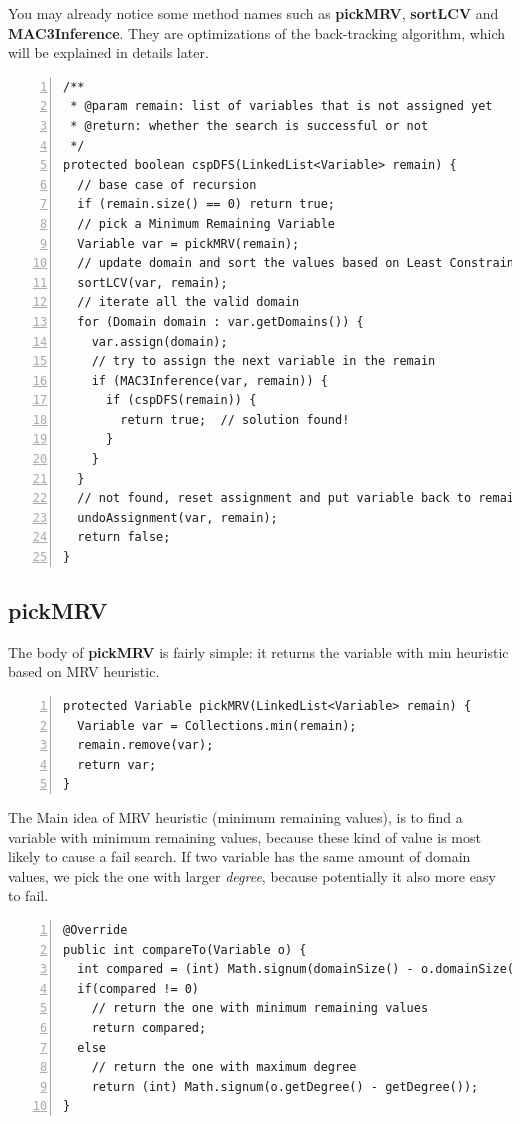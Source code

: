 \documentclass{article}
\begin{document}
You may already notice some method names such as \textbf{pickMRV}, \textbf{sortLCV} and \textbf{MAC3Inference}. They are optimizations of the back-tracking algorithm, which will be explained in details later.

\begin{lstlisting}[numbers=left, caption=CSPsolver.class]
/**
 * @param remain: list of variables that is not assigned yet
 * @return: whether the search is successful or not
 */
protected boolean cspDFS(LinkedList<Variable> remain) {
  // base case of recursion
  if (remain.size() == 0) return true;
  // pick a Minimum Remaining Variable
  Variable var = pickMRV(remain);
  // update domain and sort the values based on Least Constraining
  sortLCV(var, remain);
  // iterate all the valid domain
  for (Domain domain : var.getDomains()) {
    var.assign(domain);
    // try to assign the next variable in the remain
    if (MAC3Inference(var, remain)) {
      if (cspDFS(remain)) {
        return true;  // solution found!
      }
    }
  }
  // not found, reset assignment and put variable back to remain
  undoAssignment(var, remain);
  return false;
}
\end{lstlisting}





\clearpage
\subsection{pickMRV}

The body of \textbf{pickMRV} is fairly simple: it returns the variable with min heuristic based on MRV heuristic.

\begin{lstlisting}[numbers=left, caption=CSPsolver.class]   
protected Variable pickMRV(LinkedList<Variable> remain) {
  Variable var = Collections.min(remain);
  remain.remove(var);
  return var;
}
\end{lstlisting}

The Main idea of MRV heuristic (minimum remaining values), is to find a variable with minimum remaining values, because these kind of value is most likely to cause a fail search. If two variable has the same amount of domain values, we pick the one with larger \emph{degree}, because potentially it also more easy to fail.

\begin{lstlisting}[numbers=left, caption=CSPsolver.class]    
@Override
public int compareTo(Variable o) {
  int compared = (int) Math.signum(domainSize() - o.domainSize());
  if(compared != 0)
    // return the one with minimum remaining values
    return compared;
  else
    // return the one with maximum degree
    return (int) Math.signum(o.getDegree() - getDegree());
}
\end{lstlisting}
\end{document}
